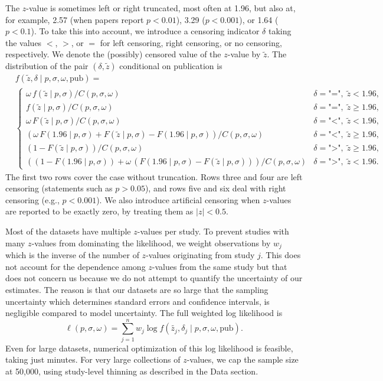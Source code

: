 \documentclass[11pt]{article}
\begin{document}
The $z$-value is sometimes left or right truncated, most often at 1.96, but also at, for example, 2.57 (when papers report $p < 0.01$), 3.29 ($p < 0.001$), or 1.64 ($p < 0.1$). To take this into account, we introduce a censoring indicator $\delta$ taking the values $<$, $>$, or $=$ for left censoring, right censoring, or no censoring, respectively. We denote the (possibly) censored value of the $z$-value by $\tilde{z}$. The distribution of the pair $(\delta,\tilde{z})$ conditional on publication is
\begin{align*}
&f(\tilde{z},\delta \mid p,\sigma, \omega, \text{pub})= \\
&\begin{cases}
\omega\,f(\tilde{z}\mid p,\sigma)/ C(p,\sigma,\omega)         
    & \delta=\texttt{"="},\; \tilde{z}<1.96,\\[4pt]
f(\tilde{z}\mid p,\sigma)/C(p,\sigma,\omega)              
    & \delta=\texttt{"="},\; \tilde{z}\ge 1.96,\\[6pt]
\omega\,F(\tilde{z}\mid p,\sigma)/ C(p,\sigma,\omega)
    & \delta=\texttt{"<"},\; \tilde{z}< 1.96,\\[4pt]
(\omega\,F(1.96\mid p,\sigma)+F(\tilde{z}\mid p,\sigma)-F(1.96\mid p,\sigma))/ C(p,\sigma,\omega)
    & \delta=\texttt{"<"},\; \tilde{z}\ge  1.96,\\[6pt]
(1-F(\tilde{z}\mid p,\sigma))/ C(p,\sigma,\omega)
    & \delta=\texttt{">"},\; \tilde{z}\ge 1.96,\\[4pt]
((1-F(1.96\mid p,\sigma))+\omega\,(F(1.96\mid p,\sigma)-F(\tilde{z}\mid p,\sigma)))/ C(p,\sigma,\omega)
    & \delta=\texttt{">"},\; \tilde{z}<  1.96.
\end{cases}
\end{align*}
\noindent
The first two rows cover the case without truncation. Rows three and four are left censoring (statements such as $p > 0.05$), and  rows five and six deal with right censoring (e.g., $p < 0.001$). We also introduce artificial censoring when $z$-values are reported to be exactly zero, by treating them as $|z| < 0.5$.

Most of the datasets have multiple $z$-values per study. To prevent studies with many $z$-values from dominating the likelihood, we weight observations by $w_j$ which is the inverse of the number of $z$-values originating from study $j$. This does not account for the dependence among $z$-values from the same study but that does not concern us because we do not attempt to quantify the uncertainty of our estimates.  The reason is that our datasets are so large that the sampling uncertainty which determines standard errors and confidence intervals, is negligible compared to model uncertainty. The full weighted log likelihood is  
\begin{equation}
\ell(p,\sigma, \omega)
= \sum_{j=1}^{n} w_j \log f(\tilde{z_j},\delta_j \mid p,\sigma, \omega, \text{pub}).               \label{eq:loglik}
\end{equation}
\noindent
Even for large datasets, numerical optimization of this log likelihood is feasible, taking just minutes.  For very large collections of $z$-values, we cap the sample size  at 50,000, using study-level thinning as described in the Data section.
\end{document}
